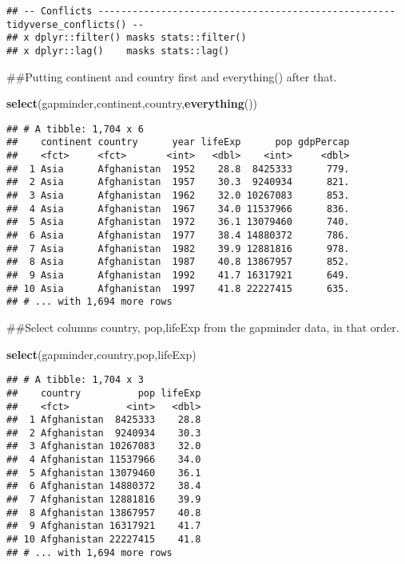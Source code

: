 \documentclass[]{article}
\newenvironment{Shaded}{\begin{snugshade}}{\end{snugshade}}
\newcommand{\KeywordTok}[1]{\textcolor[rgb]{0.13,0.29,0.53}{\textbf{#1}}}
\newcommand{\NormalTok}[1]{#1}
\begin{document}
\begin{verbatim}
## -- Conflicts ---------------------------------------------------- tidyverse_conflicts() --
## x dplyr::filter() masks stats::filter()
## x dplyr::lag()    masks stats::lag()
\end{verbatim}

\begin{Shaded}
\begin{Highlighting}[]
\NormalTok{##Putting continent and country first and everything() after that.}

\KeywordTok{select}\NormalTok{(gapminder,continent,country,}\KeywordTok{everything}\NormalTok{())}
\end{Highlighting}
\end{Shaded}

\begin{verbatim}
## # A tibble: 1,704 x 6
##    continent country      year lifeExp      pop gdpPercap
##    <fct>     <fct>       <int>   <dbl>    <int>     <dbl>
##  1 Asia      Afghanistan  1952    28.8  8425333      779.
##  2 Asia      Afghanistan  1957    30.3  9240934      821.
##  3 Asia      Afghanistan  1962    32.0 10267083      853.
##  4 Asia      Afghanistan  1967    34.0 11537966      836.
##  5 Asia      Afghanistan  1972    36.1 13079460      740.
##  6 Asia      Afghanistan  1977    38.4 14880372      786.
##  7 Asia      Afghanistan  1982    39.9 12881816      978.
##  8 Asia      Afghanistan  1987    40.8 13867957      852.
##  9 Asia      Afghanistan  1992    41.7 16317921      649.
## 10 Asia      Afghanistan  1997    41.8 22227415      635.
## # ... with 1,694 more rows
\end{verbatim}

\begin{Shaded}
\begin{Highlighting}[]
\NormalTok{##Select columns country, pop,lifeExp from the gapminder data, in that order.}

\KeywordTok{select}\NormalTok{(gapminder,country,pop,lifeExp)}
\end{Highlighting}
\end{Shaded}

\begin{verbatim}
## # A tibble: 1,704 x 3
##    country          pop lifeExp
##    <fct>          <int>   <dbl>
##  1 Afghanistan  8425333    28.8
##  2 Afghanistan  9240934    30.3
##  3 Afghanistan 10267083    32.0
##  4 Afghanistan 11537966    34.0
##  5 Afghanistan 13079460    36.1
##  6 Afghanistan 14880372    38.4
##  7 Afghanistan 12881816    39.9
##  8 Afghanistan 13867957    40.8
##  9 Afghanistan 16317921    41.7
## 10 Afghanistan 22227415    41.8
## # ... with 1,694 more rows
\end{verbatim}
\end{document}
